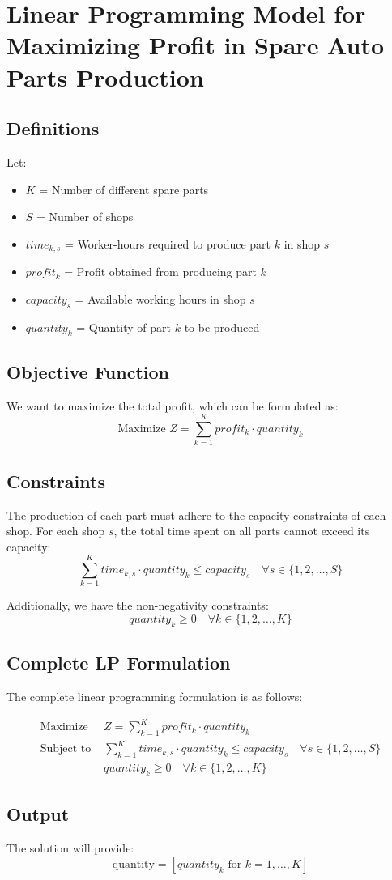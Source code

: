 \documentclass{article}
\begin{document}
\section*{Linear Programming Model for Maximizing Profit in Spare Auto Parts Production}

\subsection*{Definitions}
Let:
\begin{itemize}
    \item $K$ = Number of different spare parts
    \item $S$ = Number of shops
    \item $time_{k, s}$ = Worker-hours required to produce part $k$ in shop $s$
    \item $profit_{k}$ = Profit obtained from producing part $k$
    \item $capacity_{s}$ = Available working hours in shop $s$
    \item $quantity_{k}$ = Quantity of part $k$ to be produced
\end{itemize}

\subsection*{Objective Function}
We want to maximize the total profit, which can be formulated as:
\[
\text{Maximize } Z = \sum_{k=1}^{K} profit_{k} \cdot quantity_{k}
\]

\subsection*{Constraints}
The production of each part must adhere to the capacity constraints of each shop. For each shop $s$, the total time spent on all parts cannot exceed its capacity:
\[
\sum_{k=1}^{K} time_{k, s} \cdot quantity_{k} \leq capacity_{s} \quad \forall s \in \{1, 2, \ldots, S\}
\]

Additionally, we have the non-negativity constraints:
\[
quantity_{k} \geq 0 \quad \forall k \in \{1, 2, \ldots, K\}
\]

\subsection*{Complete LP Formulation}
The complete linear programming formulation is as follows:

\begin{align*}
\text{Maximize } & Z = \sum_{k=1}^{K} profit_{k} \cdot quantity_{k} \\
\text{Subject to } & \sum_{k=1}^{K} time_{k, s} \cdot quantity_{k} \leq capacity_{s} \quad \forall s \in \{1, 2, \ldots, S\} \\
& quantity_{k} \geq 0 \quad \forall k \in \{1, 2, \ldots, K\}
\end{align*}

\subsection*{Output}
The solution will provide:
\[
\text{quantity} = [quantity_{k} \text{ for } k = 1, \ldots, K]
\]
\end{document}
